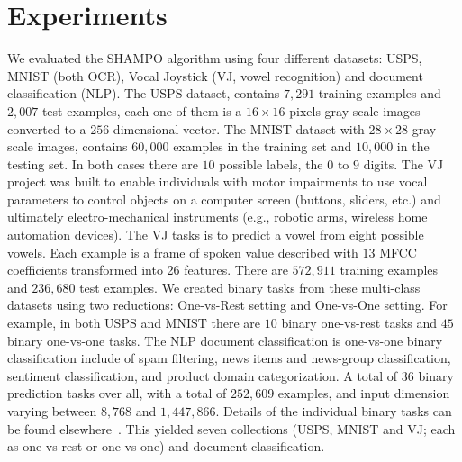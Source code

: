 \chapter{Experiments}





We evaluated the SHAMPO algorithm using four different datasets: USPS, MNIST (both OCR), Vocal Joystick 
(VJ, vowel recognition) and document classification (NLP). 
The USPS dataset, contains $7,291$ training examples and $2,007$ test examples, each one of them is a 
$16\times16$ pixels gray-scale images converted to a $256$ dimensional vector. 
The MNIST dataset with $28\times28$ gray-scale images, contains $60,000$ 
examples in the training set and $10,000$ in the testing set. In both cases there are $10$ possible labels,
the $0$ to $9$ digits. The VJ project was built to enable individuals with motor impairments to use vocal
 parameters to control objects on a computer screen (buttons, sliders, etc.) and ultimately 
 electro-mechanical instruments (e.g., robotic arms, wireless home automation devices). The VJ tasks is to 
 predict a vowel from eight possible vowels. Each example is a frame of spoken value described with $13$ 
 MFCC coefficients transformed into 26 features. There are $572,911$ training examples and $236,680$ test 
 examples. We created binary tasks from these multi-class datasets using two reductions: One-vs-Rest 
 setting and One-vs-One setting. For example, in both USPS and MNIST there are $10$ binary one-vs-rest 
 tasks and $45$ binary one-vs-one tasks.  The NLP document classification is one-vs-one  binary 
 classification include of spam filtering, news items and news-group classification, sentiment classification, 
 and product domain categorization. A total of $36$ binary prediction tasks over all, with a total of 
 $252,609$ examples, and input dimension varying between $8,768$ and $1,447,866$. 
 Details of the individual binary tasks can be found elsewhere~\cite{Crammer:2012:CLC:2343676.2343704}.
This yielded seven collections (USPS, MNIST and VJ\@; each as one-vs-rest or one-vs-one) and document 
classification.

